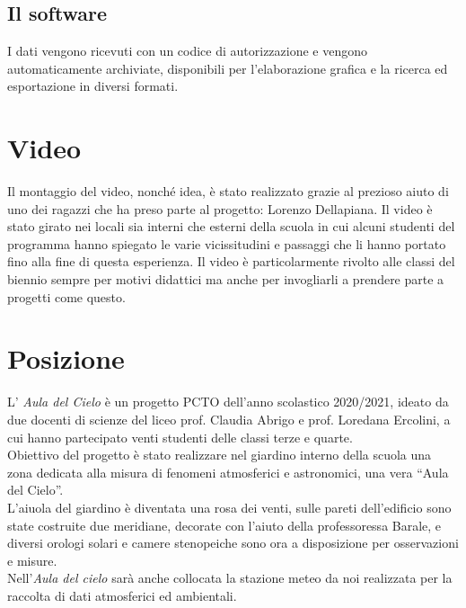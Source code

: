 \documentclass{article}
\begin{document}
\subsection{Il software}
I dati vengono ricevuti con un codice di autorizzazione e vengono automaticamente archiviate, disponibili per l'elaborazione grafica e la ricerca ed esportazione in diversi formati.
\section{Video}

Il montaggio del video, nonché idea,  è stato realizzato grazie al prezioso aiuto di uno dei ragazzi che ha preso parte al progetto: Lorenzo Dellapiana.
Il video è stato girato nei locali sia interni che esterni della scuola in cui alcuni studenti del programma hanno spiegato le varie vicissitudini e passaggi che li hanno portato fino alla fine di questa esperienza. Il video è particolarmente rivolto alle classi del biennio sempre per motivi didattici ma anche per invogliarli a prendere parte a progetti come questo.
\section{Posizione}
L' \emph{Aula del Cielo} è un progetto PCTO dell’anno scolastico 2020/2021, ideato da due docenti di scienze del liceo prof. Claudia Abrigo e prof. Loredana Ercolini, a cui hanno partecipato venti studenti delle classi terze e quarte.\\
Obiettivo del progetto è stato realizzare  nel giardino interno della scuola una zona dedicata alla misura di fenomeni atmosferici e astronomici, una vera “Aula del Cielo”. \\
L’aiuola del giardino è diventata una rosa dei venti, sulle pareti dell’edificio sono state costruite due meridiane, decorate con l’aiuto della professoressa Barale, e diversi orologi solari e camere stenopeiche sono ora a disposizione per osservazioni e misure.\\
Nell’\emph{Aula del cielo} sarà anche collocata la stazione meteo da noi realizzata per la raccolta di dati atmosferici ed ambientali.
\end{document}
